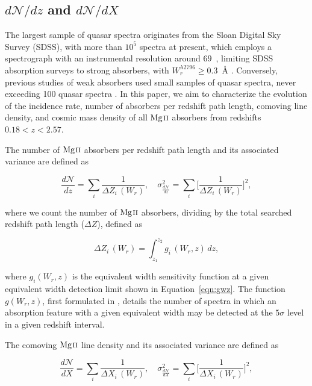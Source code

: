 \documentclass[iop,apj,numberedappendix,appendixfloats,twocolappendix]{emulateapj}
\begin{document}

\subsection{$d\mathcal{N}\!/dz$ and $d\mathcal{N}\!/dX$}
\label{dndzdndx}

The largest sample of quasar spectra originates from the Sloan Digital Sky Survey (SDSS), with more than $10^5$ spectra at present, which employs a spectrograph with an instrumental resolution around $69$~{\kms}, limiting SDSS absorption surveys to strong absorbers, with $W_r^{\lambda2796} \ge 0.3$~{\AA} \citep{Nestor2005,Zhu2013}. Conversely, previous studies of weak absorbers used small samples of quasar spectra, never exceeding 100 quasar spectra \citep{Steidel1992,Narayanan2007,Kacprzak2011}. In this paper, we aim to characterize the evolution of the incidence rate, number of absorbers per redshift path length, comoving line density, and cosmic mass density of all ${\hbox{{\rm Mg}\kern 0.1em{\sc ii}}}$ absorbers from redshifts $0.18 < z < 2.57$.

The number of ${\hbox{{\rm Mg}\kern 0.1em{\sc ii}}}$ absorbers per redshift path length and its associated variance are defined as

\begin{equation}
\frac{d \mathcal{N}}{d z} = \sum_{i}\frac{1}{\Delta Z_i\,(W_r)},\quad \sigma^2_{\frac{d \mathcal{N}}{d z}} = \sum_{i} \Big[\frac{1}{\Delta Z_i\,(W_r)}\Big]^2,
\label{eqn:dndz}
\end{equation}

\noindent
where we count the number of ${\hbox{{\rm Mg}\kern 0.1em{\sc ii}}}$ absorbers, dividing by the total searched redshift path length ($\Delta Z$), defined as

\begin{equation}
\Delta Z_i\,(W_r) = \int_{z_1}^{z_2} g_i\,(W_r, z)\,dz,
\label{eqn:deltaz}
\end{equation}

\noindent
where $g_i(W_r, z)$ is the equivalent width sensitivity function at a given equivalent width detection limit shown in Equation~\ref{eqn:gwz}. The function $g(W_r, z)$, first formulated in \cite{Lanzetta1987}, details the number of spectra in which an absorption feature with a given equivalent width may be detected at the $5\sigma$ level in a given redshift interval.

The comoving ${\hbox{{\rm Mg}\kern 0.1em{\sc ii}}}$ line density and its associated variance are defined as

\begin{equation}
\frac{d \mathcal{N}}{d X} = \sum_{i}\frac{1}{\Delta X_i\,(W_r)},\quad \sigma^2_{\frac{d \mathcal{N}}{d X}} = \sum_{i} \Big[\frac{1}{\Delta X_i\,(W_r)}\Big]^2,
\label{eqn:dndx}
\end{equation}
\end{document}
